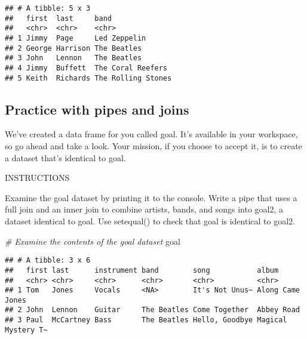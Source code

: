 \documentclass[]{article}
\newenvironment{Shaded}{\begin{snugshade}}{\end{snugshade}}
\newcommand{\KeywordTok}[1]{\textcolor[rgb]{0.13,0.29,0.53}{\textbf{#1}}}
\newcommand{\DataTypeTok}[1]{\textcolor[rgb]{0.13,0.29,0.53}{#1}}
\newcommand{\StringTok}[1]{\textcolor[rgb]{0.31,0.60,0.02}{#1}}
\newcommand{\CommentTok}[1]{\textcolor[rgb]{0.56,0.35,0.01}{\textit{#1}}}
\newcommand{\OperatorTok}[1]{\textcolor[rgb]{0.81,0.36,0.00}{\textbf{#1}}}
\newcommand{\NormalTok}[1]{#1}
\begin{document}
\begin{Shaded}
\end{Shaded}

\begin{verbatim}
## # A tibble: 5 x 3
##   first  last     band              
##   <chr>  <chr>    <chr>             
## 1 Jimmy  Page     Led Zeppelin      
## 2 George Harrison The Beatles       
## 3 John   Lennon   The Beatles       
## 4 Jimmy  Buffett  The Coral Reefers 
## 5 Keith  Richards The Rolling Stones
\end{verbatim}

\subsection{Practice with pipes and
joins}\label{practice-with-pipes-and-joins}

We've created a data frame for you called goal. It's available in your
workspace, so go ahead and take a look. Your mission, if you choose to
accept it, is to create a dataset that's identical to goal.

INSTRUCTIONS

Examine the goal dataset by printing it to the console. Write a pipe
that uses a full join and an inner join to combine artists, bands, and
songs into goal2, a dataset identical to goal. Use setequal() to check
that goal is identical to goal2.

\begin{Shaded}
\begin{Highlighting}[]
\CommentTok{# Examine the contents of the goal dataset}
\NormalTok{goal}
\end{Highlighting}
\end{Shaded}

\begin{verbatim}
## # A tibble: 3 x 6
##   first last      instrument band        song           album             
##   <chr> <chr>     <chr>      <chr>       <chr>          <chr>             
## 1 Tom   Jones     Vocals     <NA>        It's Not Unus~ Along Came Jones  
## 2 John  Lennon    Guitar     The Beatles Come Together  Abbey Road        
## 3 Paul  McCartney Bass       The Beatles Hello, Goodbye Magical Mystery T~
\end{verbatim}
\end{document}

